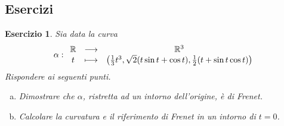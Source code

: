 \documentclass[12pt]{scrartcl}
\theoremstyle{style}
\newtheorem{esercizio}{Esercizio}[section]
\numberwithin{equation}{subsection}
\begin{document}
\subsection{Esercizi}
\begin{esercizio}
Sia data la curva
\[
	\alpha :
\begin{array}
	{c c c}
	\mathbb{R}&\longrightarrow& \mathbb{R}^3\\
	t&\longmapsto &\left(\frac{1}{3}t^3, \sqrt{2} (t \sin t + \cos t), \frac{1}{2}(t + \sin t \cos t)\right) 
\end{array}
\] 
Rispondere ai seguenti punti.
\begin{enumerate}[(a).]
	\item Dimostrare che $\alpha $, ristretta ad un intorno dell'origine, \`e di Frenet.
	\item Calcolare la curvatura e il riferimento di Frenet in un intorno di $t=0$.
\end{enumerate}
\end{esercizio}
\end{document}
